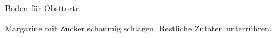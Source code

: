 \begin{recipe}{Boden für Obsttorte}

    \begin{ingredients}
    \end{ingredients}

    \begin{instructions}
        Margarine mit Zucker schaumig schlagen.
        Restliche Zutaten unterrühren.
    \end{instructions}
\end{recipe}
